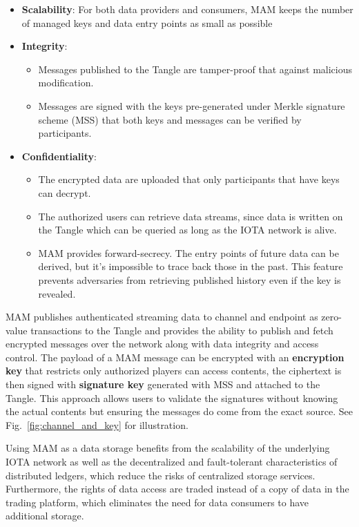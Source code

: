 \documentclass[conference]{IEEEtran}
\begin{document}
\begin{itemize}
    \item \textbf{Scalability}: For both data providers and consumers, MAM keeps the number of managed keys and data entry points as small as possible
    \item \textbf{Integrity}: 
	\begin{itemize}    	
        \item Messages published to the Tangle are tamper-proof that against malicious modification.
    	\item Messages are signed with the keys pre-generated under Merkle signature scheme\cite{MSS} (MSS) that both keys and messages can be verified by participants.
    \end{itemize}
    \item \textbf{Confidentiality}:
    \begin{itemize}    	
    	\item The encrypted data are uploaded that only participants that have keys can decrypt.
    	\item The authorized users can retrieve data streams, since data is written on the Tangle which can be queried as long as the IOTA network is alive.
    	\item MAM provides forward-secrecy. The entry points of future data can be derived, but it's impossible to trace back those in the past. This feature prevents adversaries from retrieving published history even if the key is revealed.
    \end{itemize}
\end{itemize}

MAM publishes authenticated streaming data to channel and endpoint as zero-value transactions to the Tangle and provides the ability to publish and fetch encrypted messages over the network along with data integrity and access control. The payload of a MAM message can be encrypted with an \textbf{encryption key} that restricts only authorized players can access contents, the ciphertext is then signed with \textbf{signature key} generated with MSS and attached to the Tangle. This approach allows users to validate the signatures without knowing the actual contents but ensuring the messages do come from the exact source. See Fig.~\ref{fig:channel_and_key} for illustration. 

Using MAM as a data storage benefits from the scalability of the underlying IOTA network as well as the decentralized and fault-tolerant characteristics of distributed ledgers, which reduce the risks of centralized storage services. Furthermore, the rights of data access are traded instead of a copy of data in the trading platform, which eliminates the need for data consumers to have additional storage.
\end{document}
